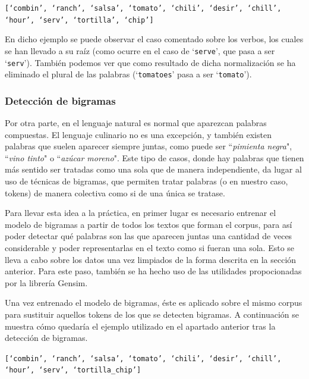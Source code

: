 \begin{enumerate}
    \begin{center}
        \texttt{[`combin', `ranch', `salsa', `tomato', `chili', `desir', `chill',  `hour', `serv', `tortilla', `chip']}
    \end{center}
    
    En dicho ejemplo se puede observar el caso comentado sobre los verbos, los cuales se han llevado a su raíz (como ocurre en el caso de `\texttt{serve}', que pasa a ser `\texttt{serv}'). También podemos ver que como resultado de dicha normalización se ha eliminado el plural de las palabras (`\texttt{tomatoes}' pasa a ser `\texttt{tomato}'). 
\end{enumerate}

\subsubsection{Detección de bigramas}
Por otra parte, en el lenguaje natural es normal que aparezcan palabras compuestas. El lenguaje culinario no es una excepción, y también existen palabras que suelen aparecer siempre juntas, como puede ser ``\textit{pimienta negra}", ``\textit{vino tinto}" o ``\textit{azúcar moreno}". Este tipo de casos, donde hay palabras que tienen más sentido ser tratadas como una sola que de manera independiente, da lugar al uso de técnicas de bigramas, que permiten tratar palabras (o en nuestro caso, tokens) de manera colectiva como si de una única se tratase. 

Para llevar esta idea a la práctica, en primer lugar es necesario entrenar el modelo de bigramas a partir de todos los textos que forman el corpus, para así poder detectar qué palabras son las que aparecen juntas una cantidad de veces considerable y poder representarlas en el texto como si fueran una sola. Esto se lleva a cabo sobre los datos una vez limpiados de la forma descrita en la sección anterior. Para este paso, también se ha hecho uso de las utilidades propocionadas por la librería Gensim. 

Una vez entrenado el modelo de bigramas, éste es aplicado sobre el mismo corpus para sustituir aquellos tokens de los que se detecten bigramas. A continuación se muestra cómo quedaría el ejemplo utilizado en el apartado anterior tras la detección de bigramas.

\begin{center}
    \texttt{[`combin', `ranch', `salsa', `tomato', `chili', `desir', `chill', `hour', `serv', `tortilla\_chip']}
\end{center}


